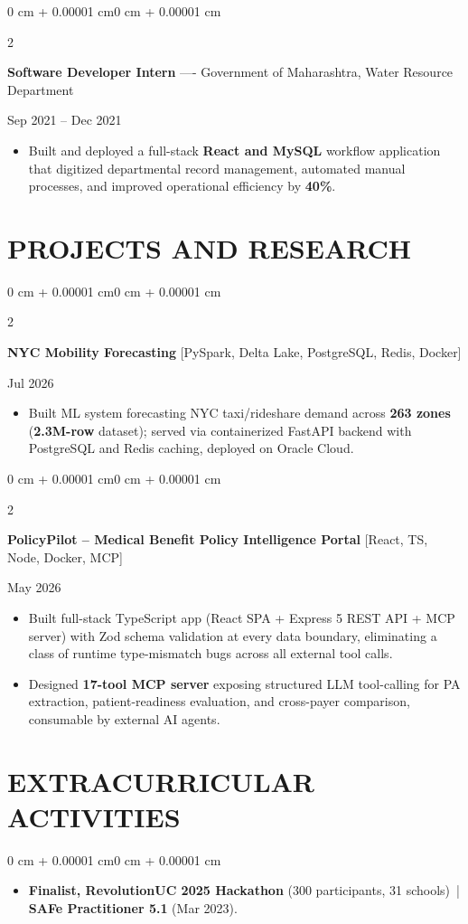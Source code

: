 \documentclass[10pt, letterpaper]{article}
\newenvironment{highlights}{
    \begin{itemize}[
        topsep=0.10 cm,
        parsep=0.06 cm,
        partopsep=0pt,
        itemsep=0.06 cm,
        leftmargin=12pt
    ]
}{
    \end{itemize}
}
\newenvironment{onecolentry}{
    \begin{adjustwidth}{0 cm + 0.00001 cm}{0 cm + 0.00001 cm}
}{
    \end{adjustwidth}
}
\newenvironment{twocolentry}[2][]{
    \onecolentry
    \def\secondColumn{#2}
    \setcolumnwidth{\fill, 4.5 cm}
    \begin{paracol}{2}
}{
    \switchcolumn \raggedleft \secondColumn
    \end{paracol}
    \endonecolentry
}
\begin{document}
\vspace{0.15 cm}

\begin{twocolentry}{Sep 2021 -- Dec 2021}
\textbf{Software Developer Intern} ---- Government of Maharashtra, Water Resource Department
\end{twocolentry}
\begin{highlights}
  \item Built and deployed a full-stack \textbf{React and MySQL} workflow application that digitized departmental record management, automated manual processes, and improved operational efficiency by \textbf{40\%}.
\end{highlights}

\section{PROJECTS AND RESEARCH}
\begin{twocolentry}{Jul 2026}
\textbf{NYC Mobility Forecasting} [PySpark, Delta Lake, PostgreSQL, Redis, Docker]
\end{twocolentry}
\begin{highlights}
  \item Built ML system forecasting NYC taxi/rideshare demand across \textbf{263 zones} (\textbf{2.3M-row} dataset); served via containerized FastAPI backend with PostgreSQL and Redis caching, deployed on Oracle Cloud.
\end{highlights}

\vspace{0.12 cm}

\begin{twocolentry}{May 2026}
\textbf{PolicyPilot -- Medical Benefit Policy Intelligence Portal} [React, TS, Node, Docker, MCP]
\end{twocolentry}
\begin{highlights}
  \item Built full-stack TypeScript app (React SPA + Express 5 REST API + MCP server) with Zod schema validation at every data boundary, eliminating a class of runtime type-mismatch bugs across all external tool calls.
  \item Designed \textbf{17-tool MCP server} exposing structured LLM tool-calling for PA extraction, patient-readiness evaluation, and cross-payer comparison, consumable by external AI agents.
\end{highlights}

\section{EXTRACURRICULAR ACTIVITIES}
\begin{onecolentry}
\begin{highlights}
  \item \textbf{Finalist, RevolutionUC 2025 Hackathon} (300 participants, 31 schools) \,|\, \textbf{SAFe Practitioner 5.1} (Mar 2023).
\end{highlights}
\end{onecolentry}
\end{document}
